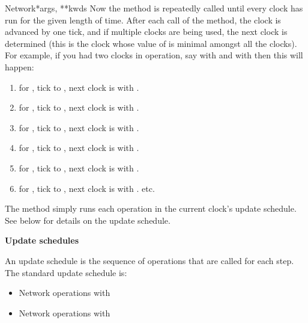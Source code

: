 \documentclass[letterpaper,10pt]{manual}
\begin{document}
\begin{classdesc}{Network}{*args, **kwds}
Now the  method is repeatedly called until every clock
has run for the given length of time. After each call of the
 method, the clock is advanced by one tick, and if
multiple clocks are being used, the next clock is determined (this
is the clock whose value of  is minimal amongst all the clocks).
For example, if you had two clocks in operation, say  with
 and  with  then this will happen:
\begin{enumerate}
\item {} 
 for , tick  to , next
clock is  with .

\item {} 
 for , tick  to , next
clock is  with .

\item {} 
 for , tick  to , next
clock is  with .

\item {} 
 for , tick  to , next
clock is  with .

\item {} 
 for , tick  to , next
clock is  with .

\item {} 
 for , tick  to , next
clock is  with . etc.

\end{enumerate}

The  method simply runs each operation in the current clock's
update schedule. See below for details on the update schedule.

\textbf{Update schedules}

An update schedule is the sequence of operations that are
called for each  step. The standard update schedule is:
\begin{itemize}
\item {} 
Network operations with 

\item {} 
Network operations with 


\end{itemize}
\end{classdesc}
\end{document}
